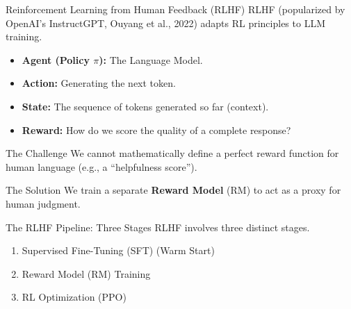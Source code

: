 \documentclass[xcolor=svgnames, 10pt, handout]{beamer}
\begin{document}
\begin{frame}{Reinforcement Learning from Human Feedback (RLHF)}
    RLHF (popularized by OpenAI's InstructGPT, Ouyang et al., 2022) adapts RL principles to LLM training.
    \pause

    \begin{itemize}
        \item \textbf{Agent (Policy $\pi$):} The Language Model.
        \item \textbf{Action:} Generating the next token.
        \item \textbf{State:} The sequence of tokens generated so far (context).
        \item \textbf{Reward:} How do we score the quality of a complete response?
    \end{itemize}
    \pause
    \begin{alertblock}{The Challenge}
        We cannot mathematically define a perfect reward function for human language (e.g., a ``helpfulness score'').
    \end{alertblock}
    \pause
    \begin{block}{The Solution}
        We train a separate \textbf{Reward Model} (RM) to act as a proxy for human judgment.
    \end{block}
\end{frame}

\begin{frame}{The RLHF Pipeline: Three Stages}
    RLHF involves three distinct stages.

    \pause

    \begin{enumerate}
        \item Supervised Fine-Tuning (SFT) (Warm Start)
        \item Reward Model (RM) Training
        \item RL Optimization (PPO)
    \end{enumerate}
\end{frame}
\end{document}
